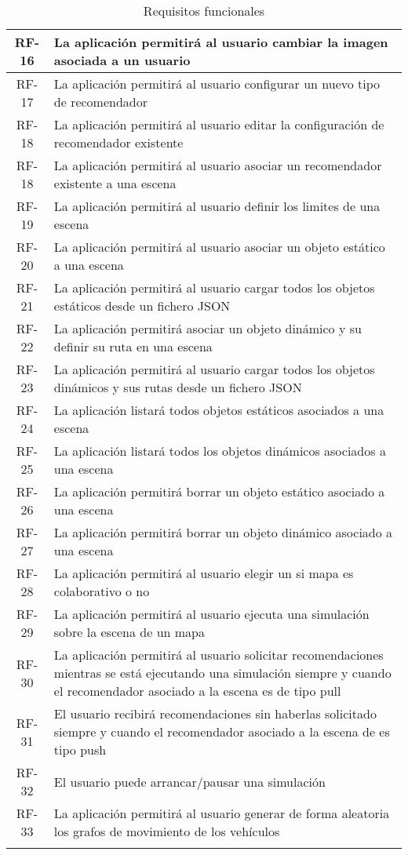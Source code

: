 \begin{longtable}[H]{|c|p{10cm}|}
	RF-16 & La aplicación permitirá al usuario cambiar la imagen asociada a un usuario\\ \hline
	RF-17 & La aplicación permitirá al usuario configurar un nuevo tipo de recomendador\\ \hline
	RF-18 & La aplicación permitirá al usuario editar la configuración de recomendador existente\\ \hline
	RF-18 & La aplicación permitirá al usuario asociar un recomendador existente a una escena\\ \hline
	RF-19 & La aplicación permitirá al usuario definir los limites de una escena\\ \hline
	RF-20 & La aplicación permitirá al usuario asociar un objeto estático a una escena\\ \hline
	RF-21 & La aplicación permitirá al usuario cargar todos los objetos estáticos desde un fichero JSON\\ \hline
	RF-22 & La aplicación permitirá asociar un objeto dinámico y su definir su ruta en una escena\\ \hline
	RF-23 & La aplicación permitirá al usuario cargar todos los objetos dinámicos y sus rutas desde un fichero JSON\\ \hline
	RF-24 & La aplicación listará todos objetos estáticos asociados a una escena \\ \hline
	RF-25 & La aplicación listará todos los objetos dinámicos asociados a una escena \\ \hline
	RF-26 & La aplicación permitirá borrar un objeto estático asociado a una escena\\ \hline
	RF-27 & La aplicación permitirá borrar un objeto dinámico asociado a una escena\\ \hline
	RF-28 & La aplicación permitirá al usuario elegir un si mapa es colaborativo o no\\ \hline
	RF-29 & La aplicación permitirá al usuario ejecuta una simulación sobre la escena de un mapa\\ \hline
	RF-30 & La aplicación permitirá al usuario solicitar recomendaciones mientras se está ejecutando una simulación siempre y cuando el recomendador asociado a la escena es de tipo pull\\ \hline
	RF-31 & El usuario recibirá recomendaciones sin haberlas solicitado siempre y cuando el recomendador asociado a la escena de es tipo push\\ \hline
	RF-32 & El usuario puede arrancar/pausar una simulación\\ \hline
	RF-33 & La aplicación permitirá al usuario generar de forma aleatoria los grafos de movimiento de los vehículos \\ \hline	
	\caption{Requisitos funcionales}
	\label{tabla:requisitosFuncionales2}
\end{longtable}


